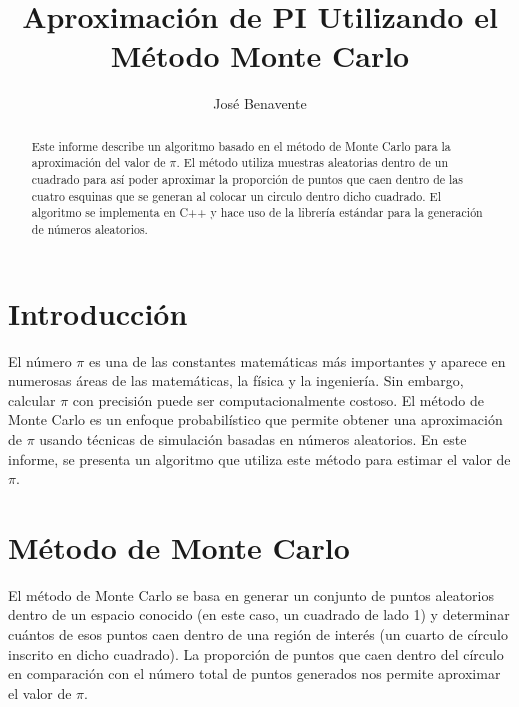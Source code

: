 \documentclass[a4paper, 10pt, onecolumn]{IEEEtran}
\begin{document}
  
  \title{Aproximación de PI Utilizando el Método Monte Carlo}
  \author{José Benavente}
  \maketitle
  
  \newpage
  
  \tableofcontents
  
  \listoffigures
  
  \listoftables
  
  \lstlistoflistings
  
  \newpage


\begin{abstract}
Este informe describe un algoritmo basado en el método de Monte Carlo para la aproximación del valor de $\pi$. El método utiliza muestras aleatorias dentro de un cuadrado para así poder aproximar la proporción de puntos que caen dentro de las cuatro esquinas que se generan al colocar un circulo dentro dicho cuadrado. El algoritmo se implementa en C++ y hace uso de la librería estándar para la generación de números aleatorios.
\end{abstract}

\section{Introducción}
El número $\pi$ es una de las constantes matemáticas más importantes y aparece en numerosas áreas de las matemáticas, la física y la ingeniería. Sin embargo, calcular $\pi$ con precisión puede ser computacionalmente costoso. El método de Monte Carlo es un enfoque probabilístico que permite obtener una aproximación de $\pi$ usando técnicas de simulación basadas en números aleatorios. En este informe, se presenta un algoritmo que utiliza este método para estimar el valor de $\pi$.

\section{Método de Monte Carlo}
El método de Monte Carlo se basa en generar un conjunto de puntos aleatorios dentro de un espacio conocido (en este caso, un cuadrado de lado 1) y determinar cuántos de esos puntos caen dentro de una región de interés (un cuarto de círculo inscrito en dicho cuadrado). La proporción de puntos que caen dentro del círculo en comparación con el número total de puntos generados nos permite aproximar el valor de $\pi$.
\end{document}
